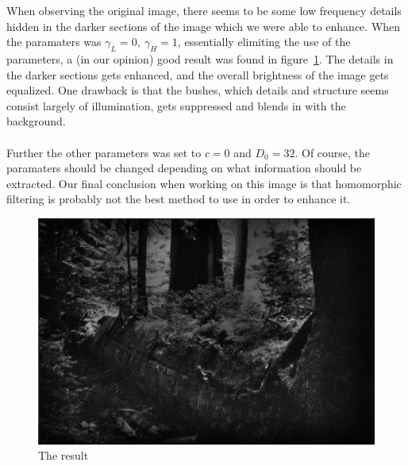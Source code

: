 		When observing the original image, there seems to be some 
		low frequency details hidden in the darker sections of the image which we were able
		to enhance. When the paramaters was $\gamma_L = 0,~\gamma_H = 1$,
		essentially elimiting the use of the parameters, a (in our opinion) good result was 
		found in figure~\ref{fig:result}. The details in the darker sections gets enhanced, 
		and the overall brightness
		of the image gets equalized. One drawback is that the bushes, which details 
		and structure seems consist
		largely of illumination, gets suppressed and blends in with the background.\\
		\\
		Further the other parameters was set to $c = 0$ and $D_0 = 32$. Of course,
		the paramaters should be changed depending on what information should be extracted.
		Our final conclusion when working on this image is that homomorphic filtering
		is probably not the best method to use in order to enhance it.
		\begin{figure}[h!]
			\includegraphics{pics/resulting_image.png}
			\caption{The result}
			\label{fig:result}		
		\end{figure}
							    
